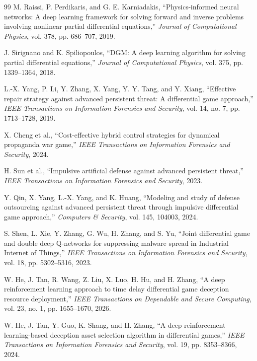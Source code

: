 \documentclass[11pt,a4paper]{article}
\begin{document}
\begin{thebibliography}{99}
M. Raissi, P. Perdikaris, and G. E. Karniadakis, ``Physics-informed neural networks: A deep learning framework for solving forward and inverse problems involving nonlinear partial differential equations,'' \emph{Journal of Computational Physics}, vol. 378, pp. 686--707, 2019.

J. Sirignano and K. Spiliopoulos, ``DGM: A deep learning algorithm for solving partial differential equations,'' \emph{Journal of Computational Physics}, vol. 375, pp. 1339--1364, 2018.

L.-X. Yang, P. Li, Y. Zhang, X. Yang, Y. Y. Tang, and Y. Xiang, ``Effective repair strategy against advanced persistent threat: A differential game approach,'' \emph{IEEE Transactions on Information Forensics and Security}, vol. 14, no. 7, pp. 1713--1728, 2019.

X. Cheng et al., ``Cost-effective hybrid control strategies for dynamical propaganda war game,'' \emph{IEEE Transactions on Information Forensics and Security}, 2024.

H. Sun et al., ``Impulsive artificial defense against advanced persistent threat,'' \emph{IEEE Transactions on Information Forensics and Security}, 2023.

Y. Qin, X. Yang, L.-X. Yang, and K. Huang, ``Modeling and study of defense outsourcing against advanced persistent threat through impulsive differential game approach,'' \emph{Computers \& Security}, vol. 145, 104003, 2024.

S. Shen, L. Xie, Y. Zhang, G. Wu, H. Zhang, and S. Yu, ``Joint differential game and double deep Q-networks for suppressing malware spread in Industrial Internet of Things,'' \emph{IEEE Transactions on Information Forensics and Security}, vol. 18, pp. 5302--5316, 2023.

W. He, J. Tan, R. Wang, Z. Liu, X. Luo, H. Hu, and H. Zhang, ``A deep reinforcement learning approach to time delay differential game deception resource deployment,'' \emph{IEEE Transactions on Dependable and Secure Computing}, vol. 23, no. 1, pp. 1655--1670, 2026.

W. He, J. Tan, Y. Guo, K. Shang, and H. Zhang, ``A deep reinforcement learning-based deception asset selection algorithm in differential games,'' \emph{IEEE Transactions on Information Forensics and Security}, vol. 19, pp. 8353--8366, 2024.


\end{thebibliography}
\end{document}
